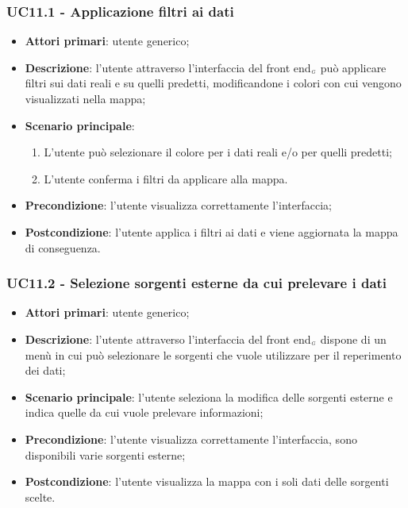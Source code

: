 \subsubsection{UC11.1 - Applicazione filtri ai dati}\label{CasiDUsoCasiDUsoFacoltativiTraUnUtenteEIlFrontEndElencoCasiDUsoUC111ApplicazioneFiltriAiDati}
\begin{itemize}
	\item \textbf{Attori primari}: utente generico;
	\item \textbf{Descrizione}: l'utente attraverso l'interfaccia del front end$_{\scaleto{G}{3pt}}$ può applicare filtri sui dati reali e su quelli predetti, modificandone i colori con cui vengono visualizzati nella mappa;
	\item \textbf{Scenario principale}:
	\begin{enumerate}
		\item L'utente può selezionare il colore per i dati reali e/o per quelli predetti;
		\item L'utente conferma i filtri da applicare alla mappa.
	\end{enumerate}
	\item \textbf{Precondizione}: l'utente visualizza correttamente l'interfaccia;
	\item \textbf{Postcondizione}: l'utente applica i filtri ai dati e viene aggiornata la mappa di conseguenza.
\end{itemize}

\subsubsection{UC11.2 - Selezione sorgenti esterne da cui prelevare i dati}\label{CasiDUsoCasiDUsoFacoltativiTraUnUtenteEIlFrontEndElencoCasiDUsoUC112SelezioneSorgentiEsterneDaCuiPrelevareIDati}
\begin{itemize}
	\item \textbf{Attori primari}: utente generico;
	\item \textbf{Descrizione}: l'utente attraverso l'interfaccia del front end$_{\scaleto{G}{3pt}}$ dispone di un menù in cui può selezionare le sorgenti che vuole utilizzare per il reperimento dei dati;
	\item \textbf{Scenario principale}: l'utente seleziona la modifica delle sorgenti esterne e indica quelle da cui vuole prelevare informazioni;
	\item \textbf{Precondizione}: l'utente visualizza correttamente l'interfaccia, sono disponibili varie sorgenti esterne;
	\item \textbf{Postcondizione}: l'utente visualizza la mappa con i soli dati delle sorgenti scelte.
\end{itemize}



